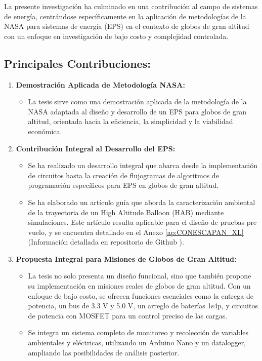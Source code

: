 La presente investigación ha culminado en una contribución al campo de sistemas de energía, centrándose específicamente en la aplicación de metodologías de la NASA para sistemas de energía (EPS) en el contexto de globos de gran altitud con un enfoque en investigación de bajo costo y complejidad controlada.

\subsection*{Principales Contribuciones:}

\begin{enumerate}
  \item \textbf{Demostración Aplicada de Metodología NASA:}
    \begin{itemize}
      \item La tesis sirve como una demostración aplicada de la metodología de la NASA adaptada al diseño y desarrollo de un EPS para globos de gran altitud, orientada hacia la eficiencia, la simplicidad y la viabilidad económica.
    \end{itemize}

  \item \textbf{Contribución Integral al Desarrollo del EPS:}
    \begin{itemize}
    \item Se ha realizado un desarrollo integral que abarca desde la implementación de circuitos hasta la creación de flujogramas de algoritmos de programación específicos para EPS en globos de gran altitud.

    \item Se ha elaborado un artículo guía que aborda la caracterización ambiental de la trayectoria de un High Altitude Balloon (HAB) mediante simulaciones. Este artículo resulta aplicable para el diseño de pruebas pre vuelo, y se encuentra detallado en el Anexo \ref{ap:CONESCAPAN_XL} (Información detallada en repositorio de Github \cite{stratoballoon_eps_batterytest}).

    \end{itemize}

  \item \textbf{Propuesta Integral para Misiones de Globos de Gran Altitud:}
    \begin{itemize}
      \item La tesis no solo presenta un diseño funcional, sino que también propone su implementación en misiones reales de globos de gran altitud. Con un enfoque de bajo costo, se ofrecen funciones esenciales como la entrega de potencia, un bus de 3.3 V y 5.0 V, un arreglo de baterías 1s4p, y circuitos de potencia con MOSFET para un control preciso de las cargas.

      \item Se integra un sistema completo de monitoreo y recolección de variables ambientales y eléctricas, utilizando un Arduino Nano y un datalogger, ampliando las posibilidades de análisis posterior.
    \end{itemize}
\end{enumerate}


